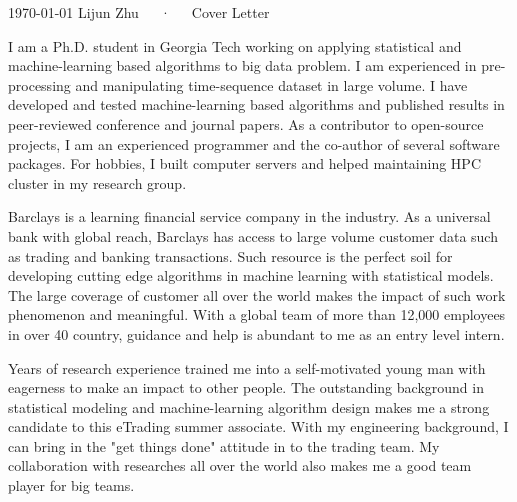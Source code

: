\documentclass[11pt, a4paper]{awesome-cv}
\begin{document}
\makecvheader[R]

\makecvfooter
  {\today}
  {Lijun Zhu~~~·~~~Cover Letter}
  {}

\makelettertitle

\begin{cvletter}

I am a Ph.D. student in Georgia Tech working on applying statistical and machine-learning based algorithms to big data problem. I am experienced in pre-processing and manipulating time-sequence dataset in large volume. I have developed and tested machine-learning based algorithms and published results in peer-reviewed conference and journal papers. As a contributor to open-source projects, I am an experienced programmer and the co-author of several software packages. For hobbies, I built computer servers and helped maintaining HPC cluster in my research group.

Barclays is a learning financial service company in the industry. As a universal bank with global reach, Barclays has access to large volume customer data such as trading and banking transactions. Such resource is the perfect soil for developing cutting edge algorithms in machine learning with statistical models. The large coverage of customer all over the world makes the impact of such work phenomenon and meaningful. With a global team of more than 12,000 employees in over 40 country, guidance and help is abundant to me as an entry level intern. 

Years of research experience trained me into a self-motivated young man with eagerness to make an impact to other people. The outstanding background in statistical modeling and machine-learning algorithm design makes me a strong candidate to this eTrading summer associate. With my engineering background, I can bring in the "get things done" attitude in to the trading team. My collaboration with researches all over the world also makes me a good team player for big teams. 

\end{cvletter}


\makeletterclosing
\end{document}
